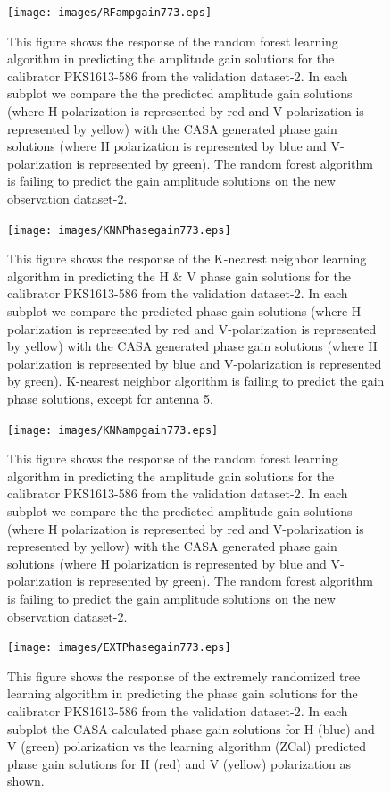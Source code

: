 \begin{figure}[H]
    \texttt{[image: images/RFampgain773.eps]}
    \caption{This figure shows the response of the random forest learning algorithm in predicting the amplitude gain solutions for the calibrator PKS1613-586 from the validation dataset-2. In each subplot we compare the the predicted amplitude gain solutions (where H polarization is represented by red and V-polarization is represented by yellow) with the CASA generated phase gain solutions (where H polarization is represented by blue and V-polarization is represented by green). The random forest algorithm is failing to predict the gain amplitude solutions on the new observation dataset-2.}
     \label{ra3}
\end{figure}

\begin{figure}[H]
    \texttt{[image: images/KNNPhasegain773.eps]}
    \caption{This figure shows the response of the K-nearest neighbor learning algorithm in predicting the H $\&$ V phase gain solutions for the calibrator PKS1613-586 from the validation dataset-2. In each subplot we compare the predicted phase gain solutions (where H polarization is represented by red and V-polarization is represented by yellow) with the CASA generated phase gain solutions (where H polarization is represented by blue and V-polarization is represented by green). K-nearest neighbor algorithm is failing to predict the gain phase solutions, except for antenna 5.}
    \label{obs11}
\end{figure}

\begin{figure}[H]
    \texttt{[image: images/KNNampgain773.eps]}
    \caption{This figure shows the response of the random forest learning algorithm in predicting the amplitude gain solutions for the calibrator PKS1613-586 from the validation dataset-2. In each subplot we compare the the predicted amplitude gain solutions (where H polarization is represented by red and V-polarization is represented by yellow) with the CASA generated phase gain solutions (where H polarization is represented by blue and V-polarization is represented by green). The random forest algorithm is failing to predict the gain amplitude solutions on the new observation dataset-2.}
     \label{ka3}
\end{figure}

\begin{figure}[H]
    \texttt{[image: images/EXTPhasegain773.eps]}
    \caption{This figure shows the response of the extremely randomized tree learning algorithm in predicting the phase gain solutions for the calibrator PKS1613-586 from the validation dataset-2. In each subplot the CASA calculated phase gain solutions for H (blue) and V (green) polarization vs the learning algorithm (ZCal) predicted phase gain solutions for H (red) and V (yellow) polarization as shown.}
    \label{obs12}
\end{figure}

